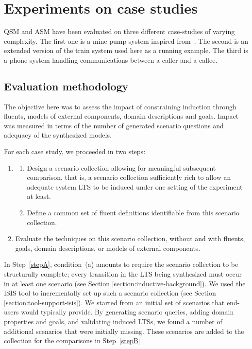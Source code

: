 \section{Experiments on case studies\label{section:evaluation-experiments-on-case-studies}}

QSM and ASM have been evaluated on three different case-studies of varying complexity. The first one is a mine pump system inspired from~\cite{Joseph:1996}. The second is an extended version of the train system used here as a running example. The third is a phone system handling communications between a caller and a callee.

\subsection{Evaluation methodology}

The objective here was to assess the impact of constraining induction through fluents, models of external components, domain descriptions and goals. Impact was measured in terms of the number of generated scenario questions and adequacy of the synthesized models.

 For each case study, we proceeded in two steps:
\begin{enumerate}
\item\label{stepA}
\begin{enumerate}
\item\label{CondA} Design a scenario collection allowing for meaningful subsequent comparison, that is, a scenario collection sufficiently rich to allow an adequate system LTS to be induced under one setting of the experiment at least.
\item\label{CondB} Define a common set of fluent definitions identifiable from this scenario collection.
\end{enumerate}
\item\label{stepB} Evaluate the techniques on this scenario collection, without and with fluents, goals, domain descriptions, or models of external components.
\end{enumerate}

In Step~\ref{stepA}, condition~(a) amounts to require the scenario collection to be structurally complete; every transition in the LTS being synthesized must occur in at least one scenario (see Section \ref{section:inductive-background}). We used the ISIS tool to incrementally set up such a scenario collection (see Section \ref{section:tool-support-isis}). We started from an initial set of scenarios that end-users would typically provide. By generating scenario queries, adding domain properties and goals, and validating induced LTSs, we found a number of additional scenarios that were initially missing. These scenarios are added to the collection for the comparisons in Step~\ref{stepB}.

